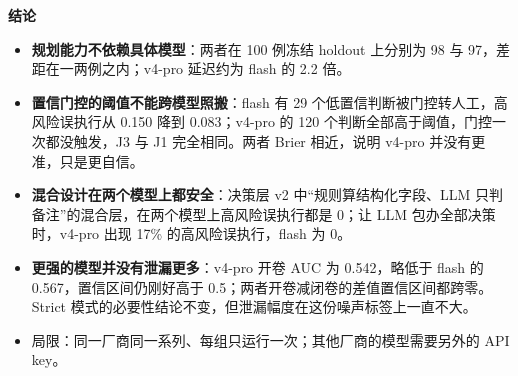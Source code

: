 \documentclass[
  10pt,
]{ctexart}
\providecommand{\tightlist}{%
  \setlength{\itemsep}{0pt}\setlength{\parskip}{0pt}}
\begin{document}
\textbf{结论}

\begin{itemize}
\tightlist
\item
  \textbf{规划能力不依赖具体模型}：两者在 100 例冻结 holdout 上分别为 98
  与 97，差距在一两例之内；v4-pro 延迟约为 flash 的 2.2 倍。
\item
  \textbf{置信门控的阈值不能跨模型照搬}：flash 有 29
  个低置信判断被门控转人工，高风险误执行从 0.150 降到 0.083；v4-pro 的
  120 个判断全部高于阈值，门控一次都没触发，J3 与 J1 完全相同。两者
  Brier 相近，说明 v4-pro 并没有更准，只是更自信。
\item
  \textbf{混合设计在两个模型上都安全}：决策层 v2
  中``规则算结构化字段、LLM
  只判备注''的混合层，在两个模型上高风险误执行都是 0；让 LLM
  包办全部决策时，v4-pro 出现 17\% 的高风险误执行，flash 为 0。
\item
  \textbf{更强的模型并没有泄漏更多}：v4-pro 开卷 AUC 为 0.542，略低于
  flash 的 0.567，置信区间仍刚好高于
  0.5；两者开卷减闭卷的差值置信区间都跨零。Strict
  模式的必要性结论不变，但泄漏幅度在这份噪声标签上一直不大。
\item
  局限：同一厂商同一系列、每组只运行一次；其他厂商的模型需要另外的 API
  key。
\end{itemize}
\end{document}
